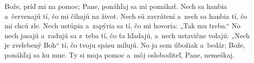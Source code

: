 Bože, príď mi na pomoc;
Pane, ponáhľaj sa mi pomáhať.
\versseparator
Nech sa hanbia a~červenajú tí,
čo mi číhajú na život.
\versseparator
Nech sú zavrátení a~nech sa hanbia tí,
čo mi chcú zle.
\versseparator
Nech ustúpia a~zapýria sa tí,
čo mi hovoria: „Tak mu treba.“
\versseparator
No nech jasajú a~radujú sa z~teba tí, čo ťa hľadajú,
a~nech ustavične volajú: „Nech je zvelebený Boh“
tí, čo tvoju spásu milujú.
\versseparator
No ja som úbožiak a~bedár;
Bože, ponáhľaj sa ku mne.
\versseparator
Ty si moja pomoc a~môj osloboditeľ,
Pane, nemeškaj.